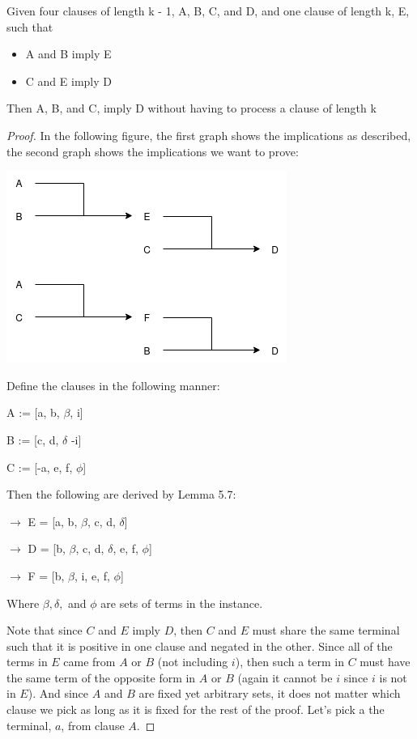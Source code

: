 \documentclass[manuscript]{acmart}
\begin{document}
    \begin{lemma}
        Given four clauses of length k - 1, A, B, C, and D, and one clause of 
        length k, E, such that 
        \begin{itemize}
            \item A and B imply E
            \item C and E imply D
        \end{itemize}
        Then A, B, and C, imply D without having to process a clause of length k
    \end{lemma}
    \begin{proof}
        
        In the following figure, the first graph shows the implications as described, the second
        graph shows the implications we want to prove:
        
        \includegraphics[scale=0.8]{317a}


        Define the clauses in the following manner:

        A := [a, b, $\beta$, i]

        B := [c, d, $\delta$ -i]

        C := [-a, e, f, $\phi$]

        Then the following are derived by Lemma 5.7:
        
        $\rightarrow$ E = [a, b, $\beta$, c, d, $\delta$]

        $\rightarrow$ D = [b, $\beta$, c, d, $\delta$, e, f, $\phi$]

        $\rightarrow$ F = [b, $\beta$, i, e, f, $\phi$]

        Where $\beta, \delta, $ and $\phi$ are sets of terms in the instance.

        Note that since $C$ and $E$ imply $D$, then $C$ and $E$ must share the
        same terminal such that it is positive in one clause and negated in the other.
        Since all of the terms in $E$ came from $A$ or $B$ (not including $i$),
        then such a term in $C$ must have the same term of the opposite form in
        $A$ or $B$ (again it cannot be $i$ since $i$ is not in $E$). And since
        $A$ and $B$ are fixed yet arbitrary sets, it does not matter which clause
        we pick as long as it is fixed for the rest of the proof. Let's pick a
        the terminal, $a$, from clause $A$.
 

\end{proof}
\end{document}
